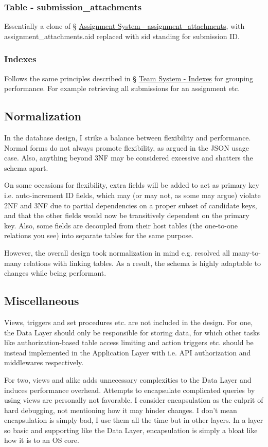 \documentclass[12pt]{report}
\newcommand{\n}{\par}
\begin{document}
\subsubsection{Table - submission\_attachments} \label{data-layer.design.assignment-system.submission_attachments}
Essentially a clone of \S{} \hyperref[data-layer.design.assignment-system.assignment_attachments]{Assignment System - assignment\_attachments},
with assignment\_attach\-ments.aid replaced with sid standing for submission ID.

\subsubsection{Indexes} \label{data-layer.design.assignment-system.indexes}
Follows the same principles described in
\S{} \hyperref[data-layer.design.team-system.indexes]{Team System - Indexes}
for grouping performance.
For example retrieving all submissions for an assignment etc.


\subsection{Normalization} \label{data-layer.design.normalization}
In the database design, I strike a balance between flexibility and performance.
Normal forms do not always promote flexibility, as argued in the JSON usage case.
Also, anything beyond 3NF may be considered excessive and shatters the schema apart.\n
On some occasions for flexibility, extra fields will be added to act as primary key i.e. auto-increment ID fields,
which may (or may not, as some may argue) violate 2NF and 3NF due to partial dependencies on a proper subset of candidate keys,
and that the other fields would now be transitively dependent on the primary key.
Also, some fields are decoupled from their host tables (the one-to-one relations you see) into separate tables for the same purpose.\n
However, the overall design took normalization in mind e.g. resolved all many-to-many relations with linking tables.
As a result, the schema is highly adaptable to changes while being performant.


\subsection{Miscellaneous} \label{data-layer.design.miscellaneous}
Views, triggers and set procedures etc. are not included in the design.
For one, the Data Layer should only be responsible for storing data,
for which other tasks like authorization-based table access limiting and
action triggers etc. should be instead implemented in the Application Layer
with i.e. API authorization and middlewares respectively.\n
For two, views and alike adds unnecessary complexities to the Data Layer and
induces performance overhead.
Attempts to encapsulate complicated queries by using views are personally not favorable.
I consider encapsulation as the culprit of hard debugging, not mentioning how it may hinder changes.
I don't mean encapsulation is simply bad, I use them all the time but in other layers.
In a layer so basic and supporting like the Data Layer, encapsulation is simply a bloat like how it is to an OS core.
\end{document}
